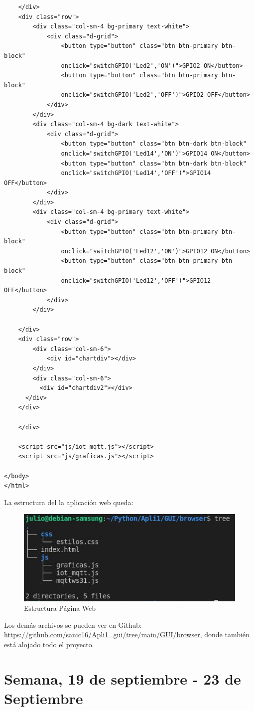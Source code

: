 \documentclass[oneside]{article}
\begin{document}
\begin{lstlisting}
    </div>
    <div class="row">
        <div class="col-sm-4 bg-primary text-white">
            <div class="d-grid">
                <button type="button" class="btn btn-primary btn-block"
                onclick="switchGPIO('Led2','ON')">GPIO2 ON</button>
                <button type="button" class="btn btn-primary btn-block"
                onclick="switchGPIO('Led2','OFF')">GPIO2 OFF</button>
            </div>
        </div>
        <div class="col-sm-4 bg-dark text-white">
            <div class="d-grid">
                <button type="button" class="btn btn-dark btn-block"
                onclick="switchGPIO('Led14','ON')">GPIO14 ON</button>
                <button type="button" class="btn btn-dark btn-block"
                onclick="switchGPIO('Led14','OFF')">GPIO14 OFF</button>
            </div>
        </div>
        <div class="col-sm-4 bg-primary text-white">
            <div class="d-grid">
                <button type="button" class="btn btn-primary btn-block"
                onclick="switchGPIO('Led12','ON')">GPIO12 ON</button>
                <button type="button" class="btn btn-primary btn-block"
                onclick="switchGPIO('Led12','OFF')">GPIO12 OFF</button>
            </div>
        </div>
        
    </div>
    <div class="row">
        <div class="col-sm-6">
            <div id="chartdiv"></div>
        </div>
        <div class="col-sm-6">
          <div id="chartdiv2"></div>
      </div>
    </div>

    </div>
       
    <script src="js/iot_mqtt.js"></script>
    <script src="js/graficas.js"></script>

</body>
</html>
\end{lstlisting}

La estructura del la aplicación web queda:
\begin{figure}[H]
\centering
\includegraphics[scale=0.75]{images/estructura.jpg}
\caption{Estructura Página Web}
\end{figure}

Los demás archivos se pueden ver en 
Github: \url{https://github.com/sanic16/Apli1_gui/tree/main/GUI/browser}, donde también está alojado todo el proyecto.

\section*{Semana, 19 de septiembre - 23 de Septiembre}


  
\end{document}
